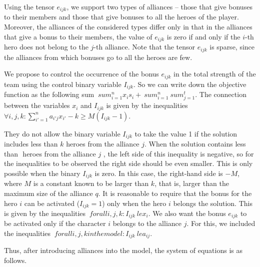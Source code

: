 \documentclass{article}
\begin{document}
Using the tensor $ e_ {ijk} $, we support two types of alliances -- those that give bonuses to their members and those that give bonuses to all the heroes of the player. Moreover, the alliances of the considered types differ only in that in the alliances that give a bonus to their members, the value of $ e_{ijk} $ is zero if and only if the $i$-th hero does not belong to the $j$-th alliance. Note that the tensor $ e_{ijk} $ is sparse, since the alliances from which bonuses go to all the heroes are few.

We propose to control the occurrence of the bonus $ e_ {ijk} $ in the total strength of the team using the control binary variable $ I_ {ijk} $.
So we can write down the objective function as the following sum $ \ sum_ {i = 1} ^ {n} x_i s_i + \ sum_ {i = 1} ^ {n} \ sum_ {j = 1} ^ {t} $.
The connection between the variables $ x_ {i} $ and $ I_ {ijk} $ is given by the inequalities
$\forall{i,j,k} :  \sum_{i'=1}^{n} a_{i'j} x_{i'} - k \ge M( I_{ijk}  - 1)$. 

They do not allow the binary variable $ I_{ijk} $ to take the value 1 if the solution includes less than $ k $ heroes from the alliance $j$. When the solution contains less than $ $ heroes from the alliance $j$ , the left side of this inequality is negative, so for the inequalities to be observed the right side should be even smaller. This is only possible when the binary $ I_{ijk} $ is zero. In this case, the right-hand side is $-M $, where $M$ is a constant known to be larger than $ k $, that is, larger than the maximum size of the alliance $q$.
It is reasonable to require that the bonus for the hero $i$ can be activated ($ I_ {ijk} = 1 $) only when the hero $i$ belongs the solution. This is given by the inequalities $ \ forall {i, j, k}: I_ {ijk} \ le x_i $. We also want the bonus $ e_ {ijk} $ to be activated only if the character $ i $ belongs to the alliance $ j $. For this, we included the inequalities $ \ forall {i, j, k} in the model: I_ {ijk} \ le a_ {ij} $.

Thus, after introducing alliances into the model, the system of equations is as follows.
\end{document}
